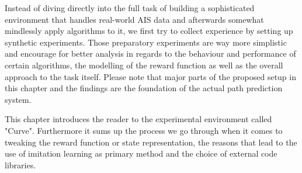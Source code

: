 Instead of diving directly into the full task of building a sophisticated environment that handles real-world AIS data and afterwards somewhat mindlessly apply algorithms to it, we first try to collect experience by setting up synthetic experiments. Those preparatory experiments are way more simplistic and encourage for better analysis in regards to the behaviour and performance of certain algorithms, the modelling of the reward function as well as the overall approach to the task itself. Please note that major parts of the proposed setup in this chapter and the findings are the foundation of the actual path prediction system.
\par
This chapter introduces the reader to the experimental environment called "Curve". Furthermore it sums up the process we go through when it comes to tweaking the reward function or state representation, the reasons that lead to the use of imitation learning as primary method and the choice of external code libraries.